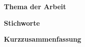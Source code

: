 %
%
\newpage
\thispagestyle{plain}
\clearpage
\hfuzz=12pt       %

\textbf{\IthesisAuthor}

\vspace{0.5cm}
\textbf{Thema der Arbeit}

\IthesisTitle

\vspace{0.3cm}
\textbf{Stichworte}

\IkeyWordsDE

\vspace{0.3cm}
\textbf{Kurzzusammenfassung}

\begin{minipage}{\textwidth}
\IabstractDE
\end{minipage}








